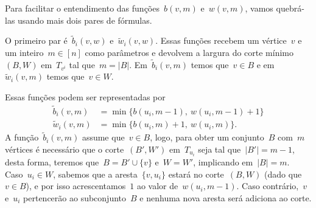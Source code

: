 \begin{itemize}
\begin{center}
 \end{center}
	Para facilitar o entendimento das funções~$b(v,m)$ 
	e~$w(v,m)$, vamos quebrá-las usando mais dois pares 
	de fórmulas.

	\medskip

	O primeiro par é~$\tilde{b}_i(v,w)$ 
	e~$\tilde{w}_i(v,w)$. 
	Essas funções recebem um 
	vértice~$v$ e um inteiro~${m\in [n]}$ como parâmetros 
	e devolvem a largura do corte mínimo~$(B,W)$ 
	em~$T_{v^i}$ tal que~${m = |B|}$. 
	Em~$\tilde{b}_i(v,m)$ temos que~${v\in B}$ e
	em~$\tilde{w}_i(v,m)$ temos que~${v\in W}$.
	
	Essas funções podem ser representadas por
	\begin{align*}
		\tilde{b}_i(v,m) &= \min \{ b(u_i,m-1),\ w(u_i, m-1)+1 \} \nonumber \\
		\tilde{w}_i(v,m) &= \min \{ b(u_i,m)+1,\ w(u_i, m) \}. \nonumber
	\end{align*}
	A função~$\tilde{b}_i(v,m)$ assume que~${v\in B}$, 
	logo, para obter um conjunto~$B$ com~$m$ vértices
	é necessário que o corte~$(B',W')$ em~$T_{u_i}$ 
	seja tal que~${|B'|=m-1}$,
	desta forma, teremos que~$B = B'\cup \{v\}$ e~$W = W'$,
	implicando em~$|B| = m$. 
	Caso~${u_i\in W}$,
	sabemos que a aresta~${\{ v,u_i \}}$ estará
	no corte~$(B,W)$ (dado que~${v\in B}$), e por isso 
	acrescentamos~$1$ ao valor de~${w(u_i, m-1)}$.
	Caso contrário,~$v$ e~$u_i$ pertencerão ao
	subconjunto~$B$ e nenhuma nova aresta
	será adiciona ao corte.


\end{itemize}

